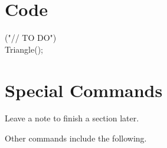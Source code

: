 \section{Code}
\begin{code}{}
    \codeitem \codepragma{} \codemessage{}("// TO DO") \\
    \stepcodelevel
        \codenew{} Triangle();\\
        \prevcodelevel
\end{code}
\vspace{0.5\baselineskip}


\section{Special Commands}
Leave a note to finish a section later.
\notfinished{}


Other commands include the following.
\begin{bulletedlist}
	\item {}
	\item {}
\end{bulletedlist} 